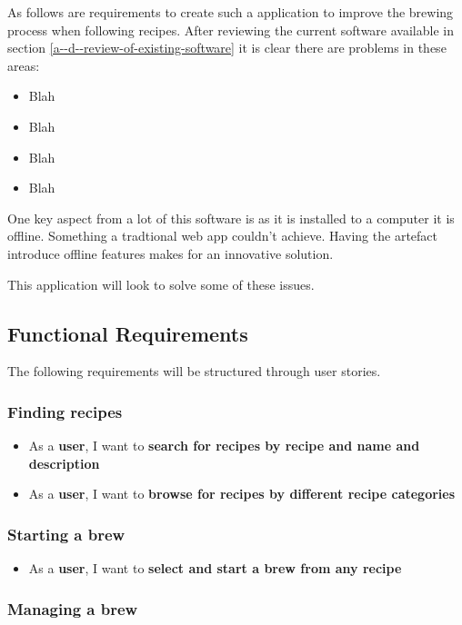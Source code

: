 As follows are requirements to create such a application to improve the brewing process when following recipes. After reviewing the current software available in section \ref{a--d--review-of-existing-software} it is clear there are problems in these areas:

\begin{itemize}
  \item Blah
  \item Blah
  \item Blah
  \item Blah
\end{itemize}

One key aspect from a lot of this software is as it is installed to a computer it is offline. Something a tradtional web app couldn't achieve. Having the artefact introduce offline features makes for an innovative solution.

This application will look to solve some of these issues.

\subsection{Functional Requirements} \label{a-d--requirements--functional}

The following requirements will be structured through user stories. %

\subsubsection{Finding recipes}

\begin{itemize}
  \item As a \textbf{user}, I want to \textbf{search for recipes by recipe and name and description}
  \item As a \textbf{user}, I want to \textbf{browse for recipes by different recipe categories}
\end{itemize}

\subsubsection{Starting a brew}

\begin{itemize}
  \item As a \textbf{user}, I want to \textbf{select and start a brew from any recipe}
\end{itemize}

\subsubsection{Managing a brew}

